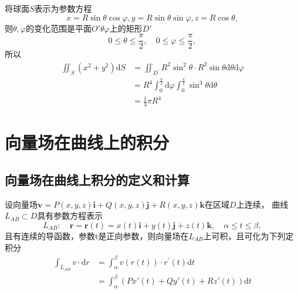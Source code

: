 \documentclass[lang=cn,10pt]{elegantbook}
\newcommand\bv[1]{\boldsymbol{#1}}
\begin{document}
\begin{solution}
    将球面$S$表示为参数方程
    \begin{equation*}
        x=R\sin\theta\cos\varphi,y=R\sin\theta\sin\varphi,z=R\cos\theta,
    \end{equation*}
    则$\theta,\varphi$的变化范围是平面$O'\theta\varphi$上的矩形$D'$
    \begin{equation*}
        0\leqslant\theta\leqslant\frac{\pi}{2},\quad0\leqslant\varphi\leqslant\frac{\pi}{2},
    \end{equation*}
    所以
    \begin{equation*}
        \begin{aligned}
            \iint_{S}(x^{2}+y^{2})\mathrm{d}S
             & =\iint_{D^{\prime}}R^2\sin^2\theta\cdot R^2\sin\theta\mathrm{d}\theta\mathrm{d}\varphi \\
             & =R^4\int_0^{\frac\pi2}\mathrm{d}\varphi\int_0^{\frac\pi2}\sin^3\theta\mathrm{d}\theta  \\
             & =\frac{1}{3}\pi R^4
        \end{aligned}
    \end{equation*}
\end{solution}

\section{向量场在曲线上的积分}
\subsection{向量场在曲线上积分的定义和计算}
\begin{theorem}
    设向量场$\bv{v}=P(x,y,z)\boldsymbol{i}+Q(x,y,z)\boldsymbol{j}+R(x,y,z)\boldsymbol{k}$在区域$D$上连续，
    曲线$L_{AB} \subset D$具有参数方程表示
    \begin{equation}
        L_{AB}:\quad\boldsymbol{r}=\boldsymbol{r}(t)=x(t)\boldsymbol{i}+y(t)\boldsymbol{j}+z(t)\boldsymbol{k},
        \quad\alpha\leqslant t\leqslant\beta,
    \end{equation}
    且有连续的导函数，参数t是正向参数，则向量场在$L_{AB}$上可积，且可化为下列定积分
    \begin{equation}
        \begin{aligned}
            \int_{L_{AB}}v\cdot\mathrm{d}r
             & =\int_{\alpha}^{\beta}v(r(t))\cdot r^{\prime}(t)\mathrm{d}t \\
             & =\int_{\alpha}^{\beta}(Px'(t)+Qy'(t)+Rz'(t))\mathrm{d}t
        \end{aligned}
    \end{equation}
\end{theorem}
\end{document}
